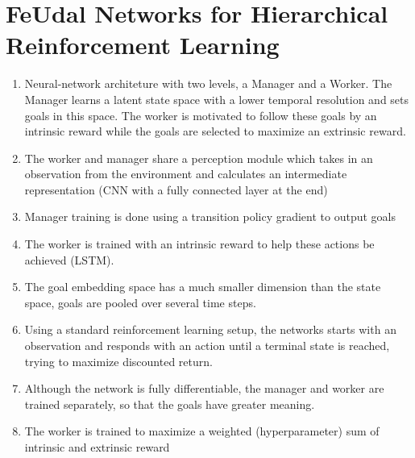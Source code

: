 \section{FeUdal Networks for Hierarchical Reinforcement Learning}
\begin{enumerate}
\item Neural-network architeture with two levels, a Manager and a Worker. The Manager learns a latent state space with a lower temporal resolution and sets goals in this space. The worker is motivated to follow these goals by an intrinsic reward while the goals are selected to maximize an extrinsic reward.
\item The worker and manager share a perception module which takes in an observation from the environment and calculates an intermediate representation (CNN with a fully connected layer at the end)
\item Manager training is done using a transition policy gradient to output goals
\item The worker is trained with an intrinsic reward to help these actions be achieved (LSTM).
\item The goal embedding space has a much smaller dimension than the state space, goals are pooled over several time steps.
\item Using a standard reinforcement learning setup, the networks starts with an observation and responds with an action until a terminal state is reached, trying to maximize discounted return.
\item Although the network is fully differentiable, the manager and worker are trained separately, so that the goals have greater meaning.
\item The worker is trained to maximize a weighted (hyperparameter) sum of intrinsic and extrinsic reward
\end{enumerate}


